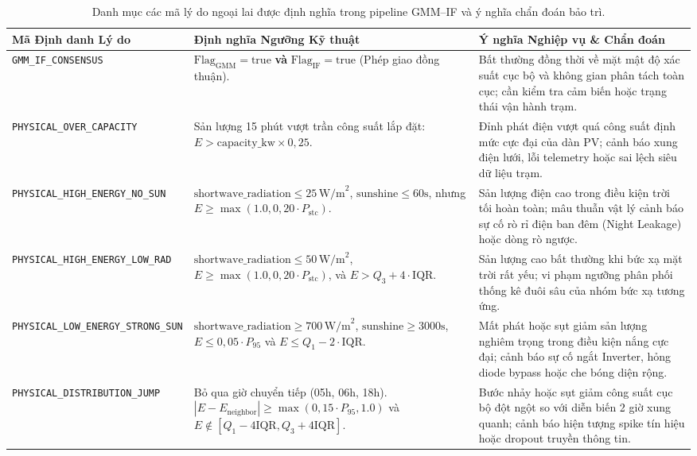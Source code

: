 \documentclass[12pt, a4paper]{report}
\begin{document}
\begin{table}[H]
\centering
\small
\renewcommand{\arraystretch}{1.3}
\begin{tabularx}{\textwidth}{@{} l p{4.5cm} X @{}}
\toprule
\textbf{Mã Định danh Lý do} & \textbf{Định nghĩa Ngưỡng Kỹ thuật} & \textbf{Ý nghĩa Nghiệp vụ \& Chẩn đoán} \\
\midrule
\texttt{GMM\_IF\_CONSENSUS} & 
$\text{Flag}_{\text{GMM}} = \text{true}$ \textbf{và} $\text{Flag}_{\text{IF}} = \text{true}$ (Phép giao đồng thuận). & 
Bất thường đồng thời về mặt mật độ xác suất cục bộ và không gian phân tách toàn cục; cần kiểm tra cảm biến hoặc trạng thái vận hành trạm. \\
\midrule
\texttt{PHYSICAL\_OVER\_CAPACITY} & 
Sản lượng 15 phút vượt trần công suất lắp đặt: $E > \text{capacity\_kw} \times 0{,}25$. & 
Đỉnh phát điện vượt quá công suất định mức cực đại của dàn PV; cảnh báo xung điện lưới, lỗi telemetry hoặc sai lệch siêu dữ liệu trạm. \\
\midrule
\texttt{PHYSICAL\_HIGH\_ENERGY\_NO\_SUN} & 
$\text{shortwave\_radiation} \le 25 \, \text{W/m}^2$, $\text{sunshine} \le 60\text{s}$, nhưng $E \ge \max(1.0, 0{,}20 \cdot P_{\text{stc}})$. & 
Sản lượng điện cao trong điều kiện trời tối hoàn toàn; mâu thuẫn vật lý cảnh báo sự cố rò rỉ điện ban đêm (Night Leakage) hoặc dòng rò ngược. \\
\midrule
\texttt{PHYSICAL\_HIGH\_ENERGY\_LOW\_RAD} & 
$\text{shortwave\_radiation} \le 50 \, \text{W/m}^2$, $E \ge \max(1.0, 0{,}20 \cdot P_{\text{stc}})$, và $E > Q_3 + 4 \cdot \text{IQR}$. & 
Sản lượng cao bất thường khi bức xạ mặt trời rất yếu; vi phạm ngưỡng phân phối thống kê đuôi sâu của nhóm bức xạ tương ứng. \\
\midrule
\texttt{PHYSICAL\_LOW\_ENERGY\_STRONG\_SUN} & 
$\text{shortwave\_radiation} \ge 700 \, \text{W/m}^2$, $\text{sunshine} \ge 3000\text{s}$, $E \le 0{,}05 \cdot P_{95}$ và $E \le Q_1 - 2 \cdot \text{IQR}$. & 
Mất phát hoặc sụt giảm sản lượng nghiêm trọng trong điều kiện nắng cực đại; cảnh báo sự cố ngắt Inverter, hỏng diode bypass hoặc che bóng diện rộng. \\
\midrule
\texttt{PHYSICAL\_DISTRIBUTION\_JUMP} & 
Bỏ qua giờ chuyển tiếp (05h, 06h, 18h). $|E - E_{\text{neighbor}}| \ge \max(0{,}15 \cdot P_{95}, 1.0)$ và $E \notin [Q_1 - 4\text{IQR}, Q_3 + 4\text{IQR}]$. & 
Bước nhảy hoặc sụt giảm công suất cục bộ đột ngột so với diễn biến 2 giờ xung quanh; cảnh báo hiện tượng spike tín hiệu hoặc dropout truyền thông tin. \\
\bottomrule
\end{tabularx}
\caption{Danh mục các mã lý do ngoại lai được định nghĩa trong pipeline GMM--IF và ý nghĩa chẩn đoán bảo trì.}
\label{tab:outlier_reasons_dict}
\end{table}
\end{document}
